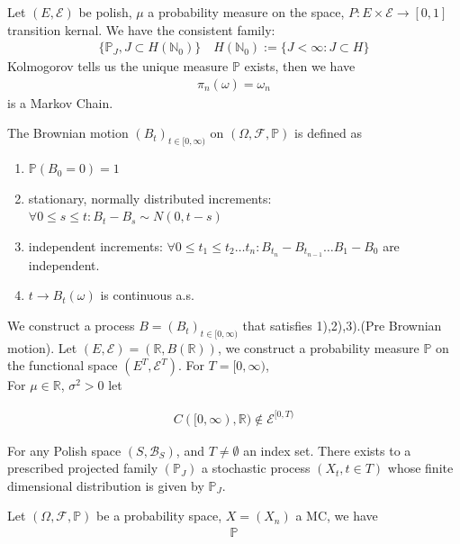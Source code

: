 \begin{example}
Let $(E, \mathcal{E})$ be polish, $\mu$ a probability measure on the space, $P:E \times \mathcal{E} \rightarrow [0, 1]$ transition kernal. We have the consistent family:
\begin{align*}
	\{\mathbb{P}_J, J \subset  H(\mathbb{N}_0)\}
	 \quad H(\mathbb{N}_0):= \{J< \infty: J \subset H\}
\end{align*}	
Kolmogorov tells us the unique measure $\mathbb{P}$ exists, then we have
\begin{align*}
	\pi_n(\omega) = \omega_n
\end{align*}
is a Markov Chain.
\end{example}

\begin{example}
The Brownian motion $(B_t)_{t \in [0, \infty)}$ on $(\Omega, \mathcal{F}, \mathbb{P})$ is defined as 
	\begin{enumerate}
		\item $\mathbb{P}(B_0 = 0) = 1$
		\item stationary, normally distributed increments: $\forall 0 \le s \le t: B_t - B_s \sim N(0, t-s)$
		\item independent increments: $\forall 0 \le t_1 \le t_2 \dots t_n: B_{t_n} - B_{t_{n-1}} \dots B_1 - B_0$ are independent.
		\item $t \rightarrow B_t(\omega)$ is continuous a.s.
	\end{enumerate}
	We construct a process $B = (B_t)_{t\in [0, \infty)}$ that satisfies 1),2),3).(Pre Brownian motion). Let $(E, \mathcal{E}) = (\mathbb{R}, B(\mathbb{R}))$, we construct a probability measure $\mathbb{P}$ on the functional space $(E^T, \mathcal{E}^T)$. For $T = [0, \infty)$, 
	\\
	For $\mu \in \mathbb{R}$, $\sigma^2 > 0$ let 
	
	\begin{align*}
		C([0, \infty), \mathbb{R}) \notin \mathcal{E}^{[0, T)}
	\end{align*}
\end{example}

\begin{corollary}
	For any Polish space $(S, \mathcal{B}_S)$, and $T \neq \emptyset$ an index set. There exists to a prescribed projected family $(\mathbb{P}_J)$ a stochastic process $(X_t, t \in T)$ whose finite dimensional distribution is given by $\mathbb{P}_J$.
\end{corollary}
Let $(\Omega, \mathcal{F}, \mathbb{P})$ be a probability space, $X = (X_n)$ a MC, we have
\begin{align*}
	\mathbb{P}
\end{align*}










